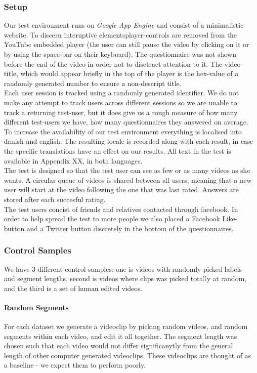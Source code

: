 \subsubsection{Setup}
%
Our test environment runs on \textit{Google App Engine} and consist of a minimalistic website. To discern interuptive elementsplayer-controls are removed from the YouTube embedded player (the user can still pause the video by clicking on it or by using the space-bar on their keyboard). The questionnaire was not shown before the end of the video in order not to disctract attention to it. The video-title, which would appear briefly in the top of the player is the hex-value of a randomly generated number to ensure a non-descript title.\\
Each user session is tracked using a randomly generated identifier. We do not make any attempt to track users across different sessions so we are unable to track a returning test-user, but it does give us a rough measure of how many different test-users we have, how many questionnaires they answered on average.\\
To increase the availability of our test environment everything is localised into danish and english. The resulting locale is recorded along with each result, in case the specific translations have an effect on our results. All text in the test is available in Appendix XX, in both languages.\\
The test is designed so that the test user can see as few or as many videos as she wants. A circular queue of videos is shared between all users, meaning that a new user will start at the video following the one that was last rated. Answers are stored after each succesful rating.\\
The test users concist of friends and relatives contacted through facebook. In order to help spread the test to more people we also placed a Facebook Like-button and a Twitter button discretely in the bottom of the questionnaires.\\
%
\subsubsection{Control Samples}
%
We have 3 different control samples: one is videos with randomly picked labels and segment lengths, second is videos where clips was picked totally at random, and the third is a set of human edited videos.
%
\paragraph{Random Segments}
% 
For each dataset we generate a videoclip by picking random videos, and random segments within each video, and edit it all together. The segment length was chosen such that each video would not differ significanytly from the general length of other computer generated videoclips. These videoclips are thought of as a baseline - we expect them to perform poorly.
%
